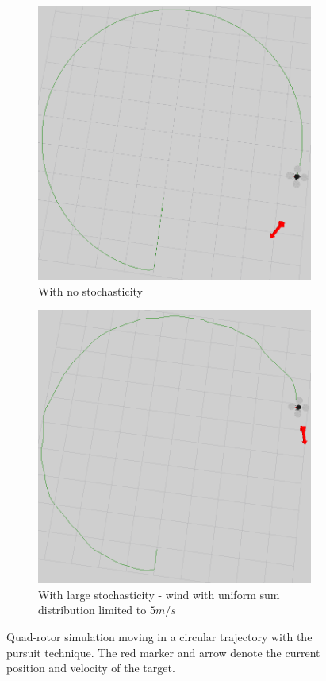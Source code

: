 \documentclass[hidelinks,BTech]{iitmdiss}
\begin{document}
\begin{figure}[H]
  \centering
  \begin{subfigure}[t]{0.45\textwidth}
    \centering
      \includegraphics[width=\textwidth]{pursuit_circle.png}
      \caption{With no stochasticity}
  \end{subfigure}
  \begin{subfigure}[t]{0.45\textwidth}
    \centering
      \includegraphics[width=\textwidth]{pursuit_circle_wind.png}
      \caption{With large stochasticity - wind with uniform sum distribution limited to $5 m/s$}
  \end{subfigure}
  \caption{Quad-rotor simulation moving in a circular trajectory with the pursuit technique. The red marker and arrow denote the current position and velocity of the target.}
\end{figure}
\end{document}
